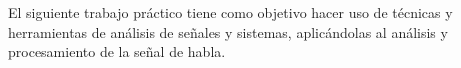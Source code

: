 	El siguiente trabajo práctico tiene como objetivo hacer uso de técnicas y herramientas de análisis de señales y sistemas, aplicándolas al análisis y procesamiento de la señal de habla.


